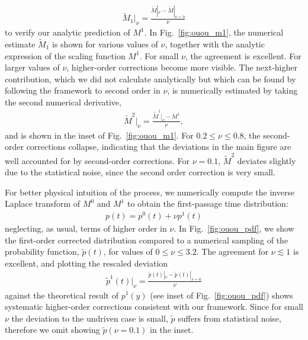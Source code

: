 \documentclass[%
 reprint,
superscriptaddress,
nofootinbib,
 amsmath,amssymb,
 aps,
prx,
]{revtex4-2}
\begin{document}
\begin{align}
    \tilde{M}_{1}|_{\nu} = \frac{\tilde{M}|_{\nu}-\tilde{M}|_{\nu=0}}{\nu}
\end{align}
to verify our analytic prediction of $M^1$. In Fig.~\ref{fig:ouou_m1}, the numerical estimate $\tilde{M}_1$ is shown for various values of $\nu$, together with the analytic expression  of the scaling function $M^1$. For small $\nu$, the agreement is excellent. For larger values of $\nu$, higher-order corrections become more visible. The next-higher contribution, which we did not calculate analytically but which can be found by following the framework to second order in $\nu$, is numerically estimated by taking the second numerical derivative,
\begin{align}
    \tilde{M}^2|_{\nu} = \frac{\tilde{M}^1|_{\nu}  -M^1}{\nu},
    \label{eq:def_cM2_ouou}
\end{align}
and is shown in the inset of Fig.~\ref{fig:ouou_m1}. For $0.2 \leq \nu \leq 0.8$, the second-order corrections collapse, indicating that the deviations in the main figure are well accounted for by second-order corrections. For $\nu=0.1$, $\tilde{M}^2$ deviates slightly due to the statistical noise, since the second order correction is very small. 

For better physical intuition of the process, we numerically compute the inverse Laplace transform \cite{valko_comparison_2004,Mathematica} of $M^0$ and $M^1$ to obtain the first-passage time distribution:
\begin{align}
p (t) = p^0(t) + \nu p^1(t)
\label{eq:empirical_fptpdf}
\end{align}
neglecting, as usual, terms of higher order in $\nu$. In Fig.~\ref{fig:ouou_pdf}, we show the first-order corrected distribution compared to a numerical sampling of the probability function, $\tilde{p}(t)$, for values of $0 \leq \nu \leq 3.2$. The agreement for $\nu \lesssim 1$ is excellent, and plotting the rescaled deviation 
\begin{align}
\tilde{p}^1(t)|_{\nu} = \frac{ \tilde{p}(t)|_{\nu} - \tilde{p}(t)|_{\nu=0}} {\nu}
\label{eq:num_estimate_f1}
\end{align}
against the theoretical result of $p^1(y)$ (see inset of Fig.~\ref{fig:ouou_pdf}) shows systematic higher-order corrections consistent with our framework. Since for small $\nu$ the deviation to the undriven case is small, $\tilde{p} $ suffers from statistical noise, therefore we omit showing $\tilde{p}(\nu=0.1)$ in the inset.
\end{document}
